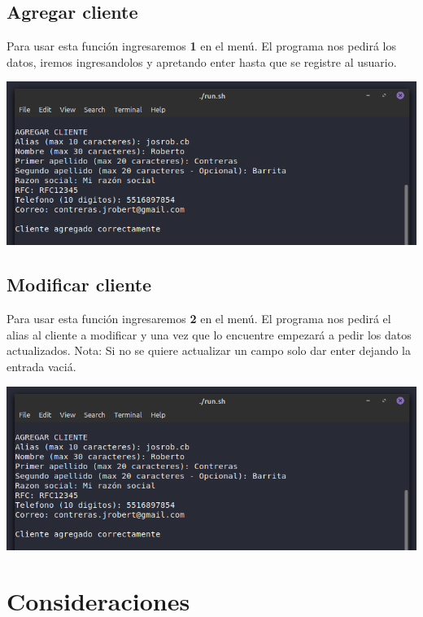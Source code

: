 \documentclass[12pt]{article}
\begin{document}
		\subsection{Agregar cliente}
			Para usar esta función ingresaremos \textbf{1} en el menú. El programa nos pedirá los datos, iremos ingresandolos y apretando enter hasta que se registre al usuario. 
			
			\includegraphics[scale=0.7]{cap4}
			
		\subsection{Modificar cliente}
			Para usar esta función ingresaremos \textbf{2} en el menú. El programa nos pedirá el alias al cliente a modificar y una vez que lo encuentre empezará a pedir los datos actualizados. Nota: Si no se quiere actualizar un campo solo dar enter dejando la entrada vaciá. 
			
			\includegraphics[scale=0.7]{cap4}\newline
	
	\newpage
	\section{Consideraciones}
\end{document}
